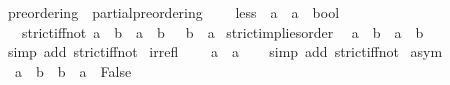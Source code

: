 \begin{isabellebody}
\isanewline
{}\isamarkupfalse%
\ preordering\ {\isacharequal}{\kern0pt}\ partial{\isacharunderscore}{\kern0pt}preordering\ {\isacharplus}{\kern0pt}\isanewline
\ \ \ less\ {\isacharcolon}{\kern0pt}{\isacharcolon}{\kern0pt}\ {\isacartoucheopen}{\isacharprime}{\kern0pt}a\ {\isasymRightarrow}\ {\isacharprime}{\kern0pt}a\ {\isasymRightarrow}\ bool{\isacartoucheclose}\ {\isacharparenleft}{\kern0pt}\ {\isacartoucheopen}\isactrlbold {\isacharless}{\kern0pt}{\isacartoucheclose}\ {}{}{\isacharparenright}{\kern0pt}\isanewline
\ \ \ strict{\isacharunderscore}{\kern0pt}iff{\isacharunderscore}{\kern0pt}not{\isacharcolon}{\kern0pt}\ {\isacartoucheopen}a\ \isactrlbold {\isacharless}{\kern0pt}\ b\ {\isasymlongleftrightarrow}\ a\ \isactrlbold {\isasymle}\ b\ {\isasymand}\ {\isasymnot}\ b\ \isactrlbold {\isasymle}\ a{\isacartoucheclose}\isanewline
{}\isanewline
\isanewline
{}\isamarkupfalse%
\ strict{\isacharunderscore}{\kern0pt}implies{\isacharunderscore}{\kern0pt}order{\isacharcolon}{\kern0pt}\isanewline
\ \ {\isacartoucheopen}a\ \isactrlbold {\isacharless}{\kern0pt}\ b\ {\isasymLongrightarrow}\ a\ \isactrlbold {\isasymle}\ b{\isacartoucheclose}\isanewline
%
\isadelimproof
\ \ %
\endisadelimproof
%
\isatagproof
{}\isamarkupfalse%
\ {\isacharparenleft}{\kern0pt}simp\ add{\isacharcolon}{\kern0pt}\ strict{\isacharunderscore}{\kern0pt}iff{\isacharunderscore}{\kern0pt}not{\isacharparenright}{\kern0pt}%
\endisatagproof
{\isafoldproof}%
%
\isadelimproof
\isanewline
%
\endisadelimproof
\isanewline
{}\isamarkupfalse%
\ irrefl{\isacharcolon}{\kern0pt}\ %
\isanewline
\ \ {\isacartoucheopen}{\isasymnot}\ a\ \isactrlbold {\isacharless}{\kern0pt}\ a{\isacartoucheclose}\isanewline
%
\isadelimproof
\ \ %
\endisadelimproof
%
\isatagproof
{}\isamarkupfalse%
\ {\isacharparenleft}{\kern0pt}simp\ add{\isacharcolon}{\kern0pt}\ strict{\isacharunderscore}{\kern0pt}iff{\isacharunderscore}{\kern0pt}not{\isacharparenright}{\kern0pt}%
\endisatagproof
{\isafoldproof}%
%
\isadelimproof
\isanewline
%
\endisadelimproof
\isanewline
{}\isamarkupfalse%
\ asym{\isacharcolon}{\kern0pt}\isanewline
\ \ {\isacartoucheopen}a\ \isactrlbold {\isacharless}{\kern0pt}\ b\ {\isasymLongrightarrow}\ b\ \isactrlbold {\isacharless}{\kern0pt}\ a\ {\isasymLongrightarrow}\ False{\isacartoucheclose}\isanewline
%
\isadelimproof
\ \ %
\endisadelimproof
%
\isatagproof

\end{isabellebody}
